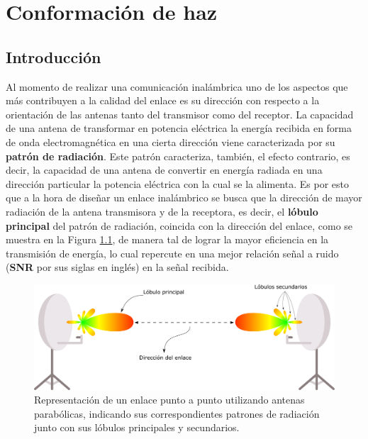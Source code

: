 \chapter{Conformación de haz}\label{ch:beamforming}

\section{Introducción}\label{subc:beamforming_intro}
Al momento de realizar una comunicación inalámbrica uno de los aspectos que más contribuyen a la calidad del enlace es su dirección con respecto a la orientación de las antenas tanto del transmisor como del receptor. La capacidad de una antena de transformar en potencia eléctrica la energía recibida en forma de onda electromagnética en una cierta dirección viene caracterizada por su \textbf{patrón de radiación}. Este patrón caracteriza, también, el efecto contrario, es decir, la capacidad de una antena de convertir en energía radiada en una dirección particular la potencia eléctrica con la cual se la alimenta. Es por esto que a la hora de diseñar un enlace inalámbrico se busca que la dirección de mayor radiación de la antena transmisora y de la receptora, es decir, el \textbf{lóbulo principal} del patrón de radiación, coincida con la dirección del enlace, como se muestra en la Figura \ref{fig:beamforming_antenasorientadas}, de manera tal de lograr la mayor eficiencia en la transmisión de energía, lo cual repercute en una mejor relación señal a ruido (\textbf{SNR} por sus siglas en inglés) en la señal recibida.

\begin{figure}[ht]
    \centering
    \includegraphics[width=1\linewidth]{images/02-Beamforming/antenasorientadas.png}
    \caption{Representación de un enlace punto a punto utilizando antenas parabólicas, indicando sus correspondientes patrones de radiación junto con sus lóbulos principales y secundarios.}
    \label{fig:beamforming_antenasorientadas}
\end{figure}

